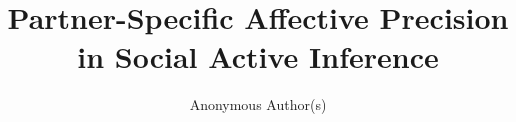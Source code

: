 \documentclass[runningheads,a4paper]{llncs}
\title{Partner-Specific Affective Precision in Social Active Inference}
\author{Anonymous Author(s)}
\institute{Anonymous Institution}
\begin{document}
\raggedbottom
\maketitle









\end{document}
